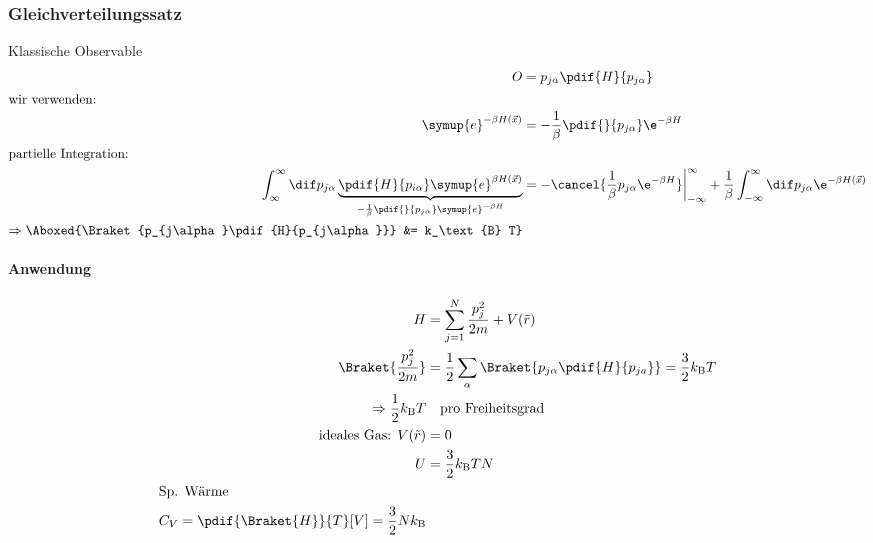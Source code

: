\subsubsection{Gleichverteilungssatz}

Klassische Observable
\begin{align}
    O &= p_{j\alpha} \pdif{H}{p_{j\alpha}}\\
\intertext{wir verwenden:}
    \symup{e}^{-\beta H(\vec x)} &=- \frac1{\beta} \pdif{}{p_{j\alpha}} \e^{-\beta H}\\
\intertext{partielle Integration:}
    \int_\infty^\infty\dif p_{j\alpha}\underbrace{\pdif{H}{p_{i\alpha}}\symup{e}^{\beta H(\vec x)}}_{-\frac{1}{\beta}\pdif{}{p_{j\alpha}}\symup{e}^{-\beta H}} 
    &= -\cancel{\frac1\beta p_{j \alpha }\e^{-\beta H}} \biggr\rvert_{-\infty}^\infty + \frac1\beta \int_{-\infty}^\infty \dif p_{j \alpha} \e^{-\beta H(\vec x)}\\
    \Rightarrow \Aboxed{\Braket{p_{j\alpha}\pdif{H}{p_{j\alpha}}} &= k_\text{B} T}
\end{align}
\paragraph{Anwendung}
\begin{align}
    H&=\sum_{j=1}^N \frac{p_j^2}{2m}+V(\tilde r)\\
    \Braket{\frac{p_j^2}{2m}} &=\frac{1}{2}\sum_\alpha \Braket{p_{j\alpha}\pdif{H}{p_{ja}}}=\frac{3}{2}k_\text{B} T\\
    \Rightarrow \frac12 k_\text{B} T &\quad \text{pro Freiheitsgrad}\\
    \text{ideales Gas:  } V(\tilde r) &= 0\\
    U&=\frac{3}{2}k_\text{B} T N\\
\intertext{Sp. Wärme}
    C_V=\pdif{\Braket{H}}{T}[V]=\frac{3}{2}N k_\text{B}
\end{align}

